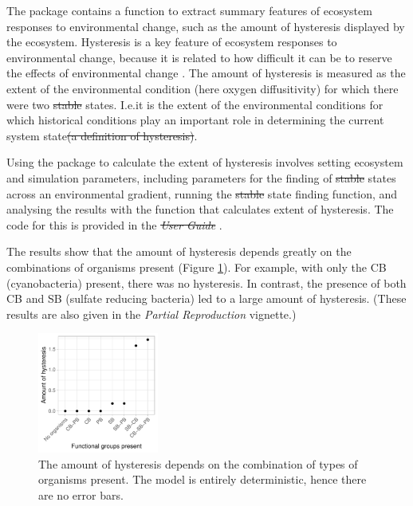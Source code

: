 \documentclass[]{elsarticle} %
\providecommand{\DIFaddtex}[1]{{\protect\color{blue}\uwave{#1}}} %
\providecommand{\DIFdeltex}[1]{{\protect\color{red}\sout{#1}}}                      %
\providecommand{\DIFaddbegin}{} %
\providecommand{\DIFaddend}{} %
\providecommand{\DIFdelbegin}{} %
\providecommand{\DIFdelend}{} %
\providecommand{\DIFadd}[1]{\texorpdfstring{\DIFaddtex{#1}}{#1}} %
\providecommand{\DIFdel}[1]{\texorpdfstring{\DIFdeltex{#1}}{}} %
\newcommand{\DIFscaledelfig}{0.5}
\newlength{\DIFdelgraphicswidth} %
\newlength{\DIFdelgraphicsheight} %
\newcommand{\DIFaddincludegraphics}[2][]{{\color{blue}\fbox{\DIFOincludegraphics[#1]{#2}}}} %
\newcommand{\DIFdelincludegraphics}[2][]{%
\sbox{\DIFdelgraphicsbox}{\DIFOincludegraphics[#1]{#2}}%
\settoboxwidth{\DIFdelgraphicswidth}{\DIFdelgraphicsbox} %
\settoboxtotalheight{\DIFdelgraphicsheight}{\DIFdelgraphicsbox} %
\scalebox{\DIFscaledelfig}{%
\parbox[b]{\DIFdelgraphicswidth}{\usebox{\DIFdelgraphicsbox}\\[-\baselineskip] \rule{\DIFdelgraphicswidth}{0em}}\llap{\resizebox{\DIFdelgraphicswidth}{\DIFdelgraphicsheight}{%
\setlength{\unitlength}{\DIFdelgraphicswidth}%
\begin{picture}(1,1)%
\thicklines\linethickness{2pt} %
{\color[rgb]{1,0,0}\put(0,0){\framebox(1,1){}}}%
{\color[rgb]{1,0,0}\put(0,0){\line( 1,1){1}}}%
{\color[rgb]{1,0,0}\put(0,1){\line(1,-1){1}}}%
\end{picture}%
}\hspace*{3pt}}} %
} %
\DeclareRobustCommand{\DIFaddbegin}{\DIFOaddbegin \let\includegraphics\DIFaddincludegraphics} %
\DeclareRobustCommand{\DIFaddend}{\DIFOaddend \let\includegraphics\DIFOincludegraphics} %
\DeclareRobustCommand{\DIFdelbegin}{\DIFOdelbegin \let\includegraphics\DIFdelincludegraphics} %
\DeclareRobustCommand{\DIFdelend}{\DIFOaddend \let\includegraphics\DIFOincludegraphics} %
\begin{document}
The package contains a function to extract summary features of ecosystem responses to environmental change, such as the amount of hysteresis displayed by the ecosystem. Hysteresis is a key feature of ecosystem responses to environmental change, because it is related to how difficult it can be to reserve the effects of environmental change \citep{Scheffer2001}. The amount of hysteresis is measured as the extent of the environmental condition (here oxygen diffusitivity) for which there were two \DIFdelbegin \DIFdel{stable }\DIFdelend \DIFaddbegin \DIFadd{steady }\DIFaddend states. I.e.\DIFaddbegin \DIFadd{, }\DIFaddend it is the extent of the environmental conditions for which historical conditions play an important role in determining the current system state\DIFdelbegin \DIFdel{(a definition of hysteresis)}\DIFdelend .

Using the package to calculate the extent of hysteresis involves setting ecosystem and simulation parameters, including parameters for the finding of \DIFdelbegin \DIFdel{stable }\DIFdelend \DIFaddbegin \DIFadd{final }\DIFaddend states across an environmental gradient, running the \DIFdelbegin \DIFdel{stable }\DIFdelend \DIFaddbegin \DIFadd{final }\DIFaddend state finding function, and analysing the results with the function that calculates extent of hysteresis. The code for this is provided in the \DIFdelbegin \emph{\DIFdel{User Guide}}%
\DIFdelend \DIFaddbegin \href{https://uzh-peg.r-universe.dev/articles/microxanox/User-guide.html}{\DIFadd{User Guide}}\DIFaddend .

The results show that the amount of hysteresis depends greatly on the combinations of organisms present (Figure \ref{fig:uc2}). For example, with only the CB (cyanobacteria) present, there was no hysteresis. In contrast, the presence of both CB and SB (sulfate reducing bacteria) led to a large amount of hysteresis. (These results are also given in the \emph{Partial Reproduction} vignette.)

\begin{figure}

{\centering \includegraphics[width=150px]{figures/gen_uc2_user_guide_hysteresis} 

}

\caption{The amount of hysteresis depends on the combination of types of organisms present. The model is entirely deterministic, hence there are no error bars.}\label{fig:uc2}
\end{figure}
\end{document}
